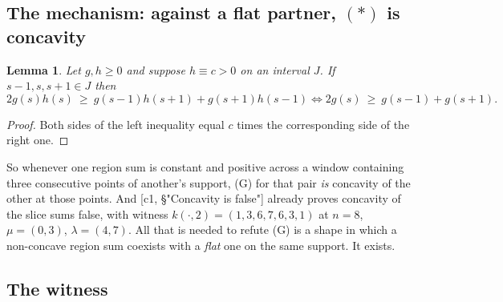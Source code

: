 \documentclass[11pt]{article}
\newtheorem{lemma}[theorem]{Lemma}
\theoremstyle{definition}
\begin{document}
\subsection{The mechanism: against a flat partner, $(*)$ is concavity}

\begin{lemma}\label{lem:flat}
Let $g,h\ge0$ and suppose $h\equiv c>0$ on an interval $J$. If $s-1,s,s+1\in J$ then
\[
  2g(s)h(s)\ \ge\ g(s-1)h(s+1)+g(s+1)h(s-1)
  \iff
  2g(s)\ \ge\ g(s-1)+g(s+1).
\]
\end{lemma}
\begin{proof}
Both sides of the left inequality equal $c$ times the corresponding side of the right one.
\end{proof}

So whenever one region sum is constant and positive across a window containing three
consecutive points of another's support, (G) for that pair \emph{is} concavity of the other
at those points. And [c1, §"Concavity is false"] already proves concavity of the slice sums
false, with witness $k(\cdot,2)=(1,3,6,7,6,3,1)$ at $n=8$, $\mu=(0,3)$, $\lambda=(4,7)$.
All that is needed to refute (G) is a shape in which a non-concave region sum coexists with
a \emph{flat} one on the same support. It exists.

\subsection{The witness}
\end{document}

